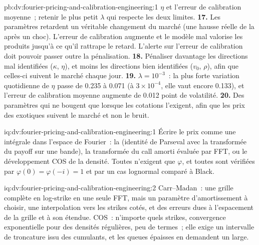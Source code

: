 \begin{solution}{pb:dv:fourier-pricing-and-calibration-engineering:1}
$\eta$ et l'erreur de calibration moyenne~; retenir le plus petit $\lambda$ qui respecte les deux limites.
\textbf{17.} Les paramètres retardent un véritable changement du marché (une hausse réelle de la  après un choc). L'erreur de calibration augmente et le
modèle mal valorise les produits jusqu'à ce qu'il rattrape le retard. L'alerte sur l'erreur de calibration doit pouvoir passer outre la pénalisation.
\textbf{18.} Pénaliser davantage les directions mal identifiées ($\kappa$, $\eta$), et moins les directions bien identifiées ($v_0$, $\rho$), afin que celles-ci suivent
le marché chaque jour.
\textbf{19.} $\lambda=10^{-3}$~: la plus forte variation quotidienne de $\eta$ passe de 0.235 à 0.071 (à $3\times10^{-4}$, elle vaut encore 0.133), et l'erreur de calibration moyenne
augmente de 0.012 point de volatilité.
\textbf{20.} Des paramètres qui ne bougent que lorsque les cotations l'exigent, afin que les prix des exotiques suivent le marché et non le bruit.
\end{solution}

\begin{solution}{iq:dv:fourier-pricing-and-calibration-engineering:1}
Écrire le prix comme une intégrale dans l'espace de Fourier~: la  (identité de Parseval avec la transformée du payoff sur une bande), la 
transformée du call amorti évaluée par FFT, ou le développement COS de la densité. Toutes n'exigent que $\varphi$, et toutes sont vérifiées par $\varphi(0)=\varphi(-i)=1$
et par un cas lognormal comparé à Black.
\end{solution}

\begin{solution}{iq:dv:fourier-pricing-and-calibration-engineering:2}
Carr--Madan~: une grille complète en log-strike en une seule FFT, mais un paramètre d'amortissement à choisir, une interpolation vers les strikes cotés, et des erreurs dues à l'espacement de la
grille et à son étendue. COS~: n'importe quels strikes, convergence exponentielle pour des densités régulières, peu de termes~; elle exige un intervalle de troncature issu des cumulants,
et les queues épaisses en demandent un large.
\end{solution}


